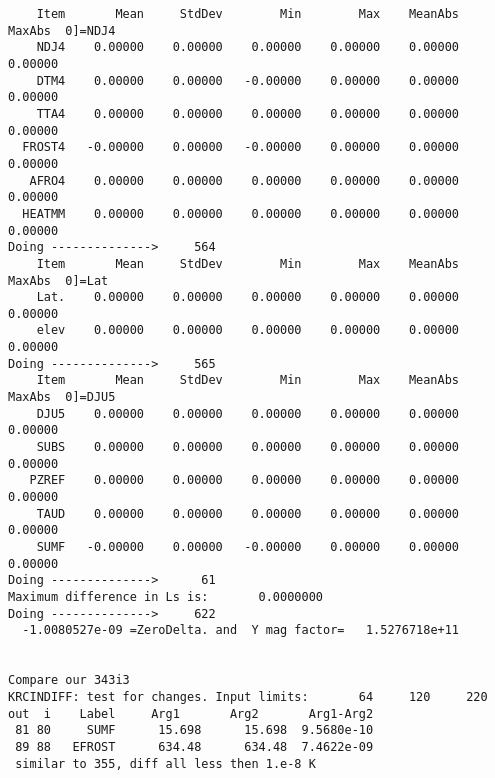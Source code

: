 \documentclass{article}
\begin{document}
\begin{verbatim}
    Item       Mean     StdDev        Min        Max    MeanAbs     MaxAbs  0]=NDJ4
    NDJ4    0.00000    0.00000    0.00000    0.00000    0.00000    0.00000
    DTM4    0.00000    0.00000   -0.00000    0.00000    0.00000    0.00000
    TTA4    0.00000    0.00000    0.00000    0.00000    0.00000    0.00000
  FROST4   -0.00000    0.00000   -0.00000    0.00000    0.00000    0.00000
   AFRO4    0.00000    0.00000    0.00000    0.00000    0.00000    0.00000
  HEATMM    0.00000    0.00000    0.00000    0.00000    0.00000    0.00000
Doing -------------->     564
    Item       Mean     StdDev        Min        Max    MeanAbs     MaxAbs  0]=Lat
    Lat.    0.00000    0.00000    0.00000    0.00000    0.00000    0.00000
    elev    0.00000    0.00000    0.00000    0.00000    0.00000    0.00000
Doing -------------->     565
    Item       Mean     StdDev        Min        Max    MeanAbs     MaxAbs  0]=DJU5
    DJU5    0.00000    0.00000    0.00000    0.00000    0.00000    0.00000
    SUBS    0.00000    0.00000    0.00000    0.00000    0.00000    0.00000
   PZREF    0.00000    0.00000    0.00000    0.00000    0.00000    0.00000
    TAUD    0.00000    0.00000    0.00000    0.00000    0.00000    0.00000
    SUMF   -0.00000    0.00000   -0.00000    0.00000    0.00000    0.00000
Doing -------------->      61
Maximum difference in Ls is:       0.0000000
Doing -------------->     622
  -1.0080527e-09 =ZeroDelta. and  Y mag factor=   1.5276718e+11


Compare our 343i3
KRCINDIFF: test for changes. Input limits:       64     120     220
out  i    Label     Arg1       Arg2       Arg1-Arg2
 81 80     SUMF      15.698      15.698  9.5680e-10
 89 88   EFROST      634.48      634.48  7.4622e-09
 similar to 355, diff all less then 1.e-8 K
\end{verbatim}  
\end{document}
